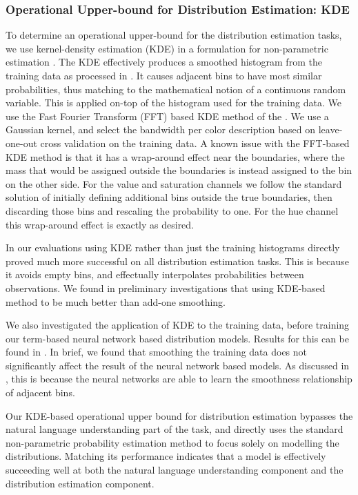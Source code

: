 \documentclass[]{clv3}
\newcommand{\parencite}{\citep}
\newcommand{\textcite}{\citet}
\begin{document}
\subsubsection{Operational Upper-bound for Distribution Estimation: KDE}\label{sec:direct-histogram} \label{sec:kernel-density-based-smoothing}
To determine an operational upper-bound for the distribution estimation tasks,
we use kernel-density estimation (KDE) in a formulation for non-parametric estimation \parencite{silverman1986density} .
The KDE effectively produces a smoothed histogram from the training data as processed in .
It causes adjacent bins to have most similar probabilities, thus matching to the mathematical notion of a continuous random variable.
This is applied on-top of the histogram used for the training data.
We use the Fast Fourier Transform (FFT) based KDE method of the \textcite{silverman1982algorithm}.
We use a Gaussian kernel, and select the bandwidth per color description based on leave-one-out cross validation on the training data.
A known issue with the FFT-based KDE method is that it has a wrap-around effect near the boundaries, where the mass that would be assigned outside the boundaries is instead assigned to the bin on the other side.
For the value and saturation channels we follow the standard solution of initially defining additional bins outside the true boundaries, then discarding those bins and rescaling the probability to one.
For the hue channel this wrap-around effect is exactly as desired.

In our evaluations using KDE rather than just the training histograms directly proved much more successful on all distribution estimation tasks.
This is because it avoids empty bins, and effectually interpolates probabilities between observations.
We found in preliminary investigations that using KDE-based method to be much better than add-one smoothing.

We also investigated the application of KDE to the training data,  before training our term-based neural network based distribution models.
Results for this can be found in .
In brief, we found that smoothing the training data does not significantly affect the result of the neural network based models.
As discussed in , this is because the neural networks are able to learn the smoothness relationship of adjacent bins.


Our KDE-based operational upper bound for distribution estimation bypasses the natural language understanding part of the task,
and directly uses the standard non-parametric probability estimation method to focus solely on modelling the distributions.
Matching its performance indicates that a model is effectively succeeding well at both the natural language understanding component and the distribution estimation component.
\end{document}
